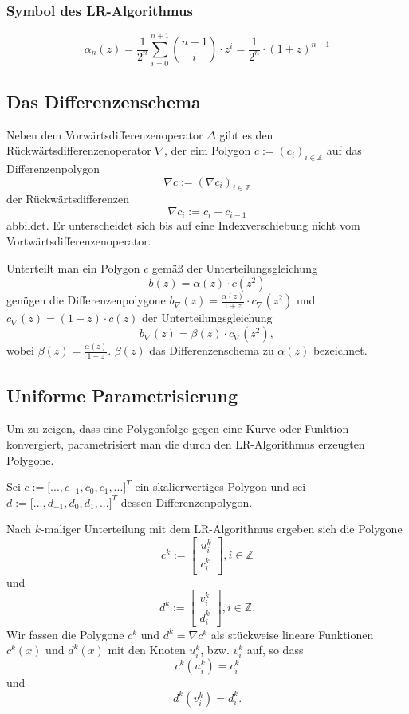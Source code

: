 \subsubsection{Symbol des LR-Algorithmus}
\[\alpha_n(z) = \frac{1}{2^n} \sum_{i=0}^{n+1} \binom{n+1}{i} \cdot z^i = \frac{1}{2^n}\cdot (1+z)^{n+1}\]


\subsection{Das Differenzenschema}
Neben dem Vorwärtsdifferenzenoperator \(\Delta\) gibt es den Rückwärtsdifferenzenoperator \(\nabla\), der eim Polygon \(c:=(c_i)_{i \in \mathbb{Z}}\) auf das Differenzenpolygon
\[\nabla c := (\nabla c_i)_{i \in \mathbb{Z}}\]
der Rückwärtsdifferenzen
\[\nabla c_i := c_i - c_{i-1}\]
abbildet. Er unterscheidet sich bis auf eine Indexverschiebung nicht vom Vortwärtsdifferenzenoperator.

Unterteilt man ein Polygon \(c\) gemäß der Unterteilungsgleichung
\[b(z) = \alpha(z) \cdot c(z^2)\]
genügen die Differenzenpolygone \(b_{\nabla}(z) = \frac{\alpha(z)}{1+z} \cdot c_{\nabla}(z^2)\) und \(c_{\nabla}(z) = (1-z)\cdot c(z)\) der Unterteilungsgleichung
\[b_{\nabla}(z) = \beta(z) \cdot c_{\nabla}(z^2),\]
wobei \(\beta(z) = \frac{\alpha(z)}{1+z}\). \(\beta(z)\) das Differenzenschema zu \(\alpha(z)\) bezeichnet.


\subsection{Uniforme Parametrisierung}
Um zu zeigen, dass eine Polygonfolge gegen eine Kurve oder Funktion konvergiert, parametrisiert man die durch den LR-Algorithmus erzeugten Polygone.

Sei \(c := \lbrack ...,c_{-1},c_0,c_1,...\rbrack^T\) ein skalierwertiges Polygon und sei \(d := \lbrack ...,d_{-1},d_0,d_1,...\rbrack^T\) dessen Differenzenpolygon.

Nach \(k\)-maliger Unterteilung mit dem LR-Algorithmus ergeben sich die Polygone
\[c^k := \begin{bmatrix} u_i^k \\ c_i^k \end{bmatrix}, i \in \mathbb{Z}\]
und
\[d^k := \begin{bmatrix} v_i^k \\ d_i^k \end{bmatrix}, i \in \mathbb{Z}.\]
Wir fassen die Polygone \(c^k\) und \(d^k = \nabla c^k\) als stückweise lineare Funktionen \(c^k(x)\) und \(d^k(x)\) mit den Knoten \(u_i^k\), bzw. \(v_i^k\) auf, so dass
\[c^k(u_i^k) = c_i^k\]
und
\[d^k(v_i^k) = d_i^k.\]

